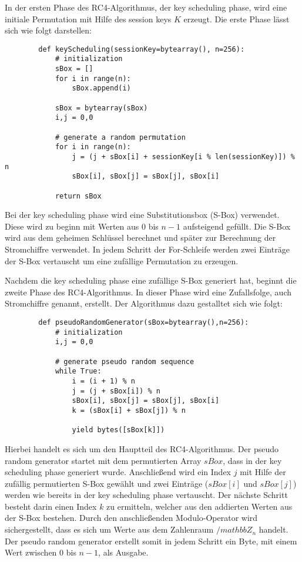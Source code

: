 \documentclass[10pt,a4paper]{article}
\begin{document}
In der ersten Phase des RC4-Algorithmus, der key scheduling phase, wird eine initiale Permutation mit Hilfe des session keys $K$ erzeugt. Die erste Phase lässt sich wie folgt darstellen:
\begin{lstlisting}
		def keyScheduling(sessionKey=bytearray(), n=256):
    		# initialization
    		sBox = []
    		for i in range(n):
        		sBox.append(i)

    		sBox = bytearray(sBox)
    		i,j = 0,0

    		# generate a random permutation
    		for i in range(n):
        		j = (j + sBox[i] + sessionKey[i % len(sessionKey)]) % n
        		sBox[i], sBox[j] = sBox[j], sBox[i]

    		return sBox
\end{lstlisting}
Bei der key scheduling phase wird eine Substitutionsbox (S-Box) verwendet. Diese wird zu beginn mit Werten aus 0 bis $n-1$ aufsteigend gefüllt. Die S-Box wird aus dem geheimen Schlüssel berechnet und später zur Berechnung der Stromchiffre verwendet. In jedem Schritt der For-Schleife werden zwei Einträge der S-Box vertauscht um eine zufällige Permutation zu erzeugen. 

Nachdem die key scheduling phase eine zufällige S-Box generiert hat, beginnt die zweite Phase des RC4-Algorithmus. In dieser Phase wird eine Zufallsfolge, auch Stromchiffre genannt, erstellt. Der Algorithmus dazu gestalltet sich wie folgt:
\begin{lstlisting}
		def pseudoRandomGenerator(sBox=bytearray(),n=256):
    		# initialization
    		i,j = 0,0

    		# generate pseudo random sequence
    		while True:
        		i = (i + 1) % n
        		j = (j + sBox[i]) % n
        		sBox[i], sBox[j] = sBox[j], sBox[i]
        		k = (sBox[i] + sBox[j]) % n

        		yield bytes([sBox[k]])
\end{lstlisting}
Hierbei handelt es sich um den Hauptteil des RC4-Algorithmus.  Der pseudo random generator startet mit dem permutierten Array $sBox$, dass in der key scheduling phase generiert wurde. Anschließend wird ein Index $j$ mit Hilfe der zufällig permutierten S-Box gewählt und zwei Einträge ($sBox[i]$ und $sBox[j]$) werden wie bereits in der key scheduling phase vertauscht. Der nächste Schritt besteht darin einen Index $k$ zu ermitteln, welcher aus den addierten Werten aus der S-Box bestehen. Durch den anschließenden Modulo-Operator wird sichergestellt, dass es sich um Werte aus dem Zahlenraum $/mathbb{Z}_n$ handelt. Der pseudo random generator erstellt somit in jedem Schritt ein Byte, mit einem Wert zwischen $0$ bis $n-1$, als Ausgabe.
\end{document}
